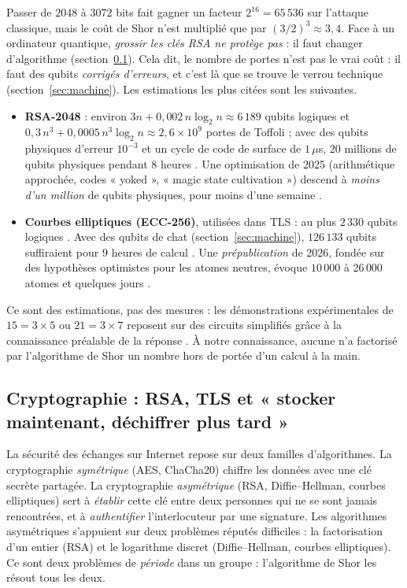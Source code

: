 Passer de $2048$ à $3072$ bits fait gagner un facteur $2^{16}=65\,536$ sur l'attaque classique, mais le coût de
Shor n'est multiplié que par $(3/2)^3\approx3{,}4$. Face à un ordinateur quantique, \emph{grossir
les clés RSA ne protège pas} : il faut changer d'algorithme (section~\ref{sec:crypto}). Cela dit, le nombre de portes
n'est pas le vrai coût : il faut des qubits \emph{corrigés d'erreurs}, et c'est là que se trouve le verrou technique
(section~\ref{sec:machine}). Les estimations les plus citées sont les suivantes.
\begin{itemize}[nosep]
  \item \textbf{RSA-2048} : environ $3n+0{,}002\,n\log_2n\approx6\,189$ qubits logiques et
        $0{,}3\,n^3+0{,}0005\,n^3\log_2n\approx2{,}6\times10^9$ portes de Toffoli ; avec des qubits physiques
        d'erreur $10^{-3}$ et un cycle de code de surface de $1\,\mu$s, $20$ millions de qubits physiques pendant
        $8$ heures \parencite{gidney2021}. Une optimisation de 2025 (arithmétique approchée, codes « yoked »,
        « magic state cultivation ») descend à \emph{moins d'un million} de qubits physiques, pour moins d'une
        semaine \parencite{gidney2025}.
  \item \textbf{Courbes elliptiques (ECC-256)}, utilisées dans TLS : au plus $2\,330$ qubits logiques
        \parencite{roetteler2017}. Avec des qubits de chat (section~\ref{sec:machine}), $126\,133$ qubits suffiraient
        pour $9$ heures de calcul \parencite{gouzien2023}. Une \emph{prépublication} de 2026, fondée sur des
        hypothèses optimistes pour les atomes neutres, évoque $10\,000$ à $26\,000$ atomes et quelques
        jours \parencite{cain2026}.
\end{itemize}
Ce sont des estimations, pas des mesures : les démonstrations expérimentales de $15=3\times5$ ou
$21=3\times7$ reposent sur des circuits simplifiés grâce à la connaissance préalable de la réponse
\parencite{smolin2013}. À notre connaissance, aucune n'a factorisé par l'algorithme de Shor un nombre hors de portée d'un
calcul à la main.

\subsection{Cryptographie : RSA, TLS et « stocker maintenant, déchiffrer plus tard »}\label{sec:crypto}

La sécurité des échanges sur Internet repose sur deux familles d'algorithmes. La cryptographie
\emph{symétrique} (AES, ChaCha20) chiffre les données avec une clé secrète partagée. La cryptographie
\emph{asymétrique} (RSA, Diffie--Hellman, courbes elliptiques) sert à \emph{établir} cette clé entre deux
personnes qui ne se sont jamais rencontrées, et à \emph{authentifier} l'interlocuteur par une signature. Les
algorithmes asymétriques s'appuient sur deux problèmes réputés difficiles : la factorisation d'un entier
(RSA) et le logarithme discret (Diffie--Hellman, courbes elliptiques). Ce sont deux problèmes de
\emph{période} dans un groupe : l'algorithme de Shor les résout tous les deux.

